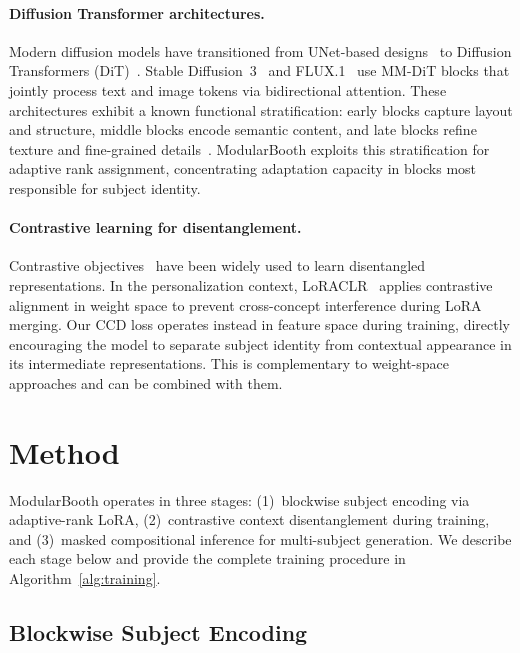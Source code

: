 \documentclass{article}
\begin{document}
\paragraph{Diffusion Transformer architectures.}
Modern diffusion models have transitioned from UNet-based designs~\citep{rombach2022high} to Diffusion Transformers (DiT)~\citep{peebles2023dit}.
Stable Diffusion~3~\citep{esser2024scaling} and FLUX.1~\citep{blackforestlabs2024flux} use MM-DiT blocks that jointly process text and image tokens via bidirectional attention.
These architectures exhibit a known functional stratification: early blocks capture layout and structure, middle blocks encode semantic content, and late blocks refine texture and fine-grained details~\citep{zhu2025blocklora}.
ModularBooth exploits this stratification for adaptive rank assignment, concentrating adaptation capacity in blocks most responsible for subject identity.

\paragraph{Contrastive learning for disentanglement.}
Contrastive objectives~\citep{chen2020simclr, oord2018infonce} have been widely used to learn disentangled representations.
In the personalization context, LoRACLR~\citep{loraclr2025} applies contrastive alignment in weight space to prevent cross-concept interference during LoRA merging.
Our CCD loss operates instead in feature space during training, directly encouraging the model to separate subject identity from contextual appearance in its intermediate representations.
This is complementary to weight-space approaches and can be combined with them.

\section{Method}
\label{sec:method}

ModularBooth operates in three stages: (1)~blockwise subject encoding via adaptive-rank LoRA, (2)~contrastive context disentanglement during training, and (3)~masked compositional inference for multi-subject generation.
We describe each stage below and provide the complete training procedure in Algorithm~\ref{alg:training}.

\subsection{Blockwise Subject Encoding}
\label{sec:blockwise}
\end{document}
